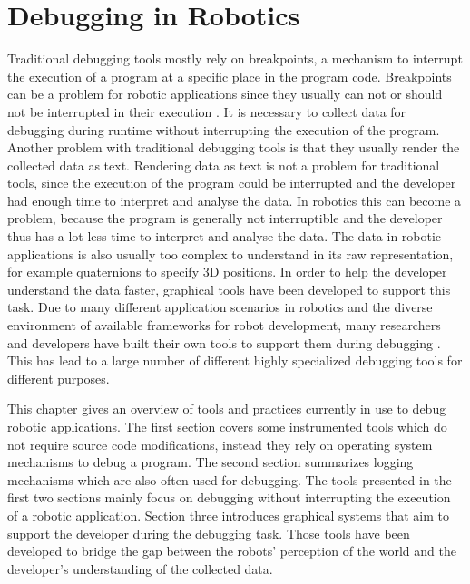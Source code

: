 \chapter{Debugging in Robotics}
\label{debugging_in_robotics}

Traditional debugging tools mostly rely on breakpoints, a mechanism to interrupt the execution of a program at a specific place in the program code. Breakpoints can be a problem for robotic applications since they usually can not or should not be interrupted in their execution \cite{Gumbley2009}. It is necessary to collect data for debugging during runtime without interrupting the execution of the program.
Another problem with traditional debugging tools is that they usually render the collected data as text. Rendering data as text is not a problem for traditional tools, since the execution of the program could be interrupted and the developer had enough time to interpret and analyse the data. In robotics this can become a problem, because the program is generally not interruptible and the developer thus has a lot less time to interpret and analyse the data. The data in robotic applications is also usually too complex to understand in its raw representation, for example quaternions to specify 3D positions. In order to help the developer understand the data faster, graphical tools have been developed to support this task. Due to many different application scenarios in robotics and the diverse environment of available frameworks for robot development, many researchers and developers have built their own tools to support them during debugging \cite{Collett2010}. This has lead to a large number of different highly specialized debugging tools for different purposes.

This chapter gives an overview of tools and practices currently in use to debug robotic applications. The first section covers some instrumented tools which do not require source code modifications, instead they rely on operating system mechanisms to debug a program. The second section summarizes logging mechanisms which are also often used for debugging. The tools presented in the first two sections mainly focus on debugging without interrupting the execution of a robotic application. Section three introduces graphical systems that aim to support the developer during the debugging task. Those tools have been developed to bridge the gap between the robots' perception of the world and the developer's understanding of the collected data.

